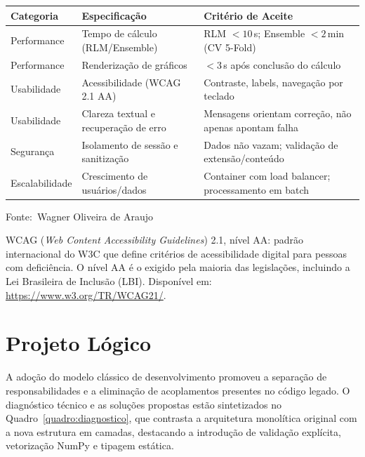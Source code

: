 \documentclass[12pt,a4paper]{article}
\newcommand{\oautor}{Wagner Oliveira de Araujo}
\begin{document}
\begin{quadro}[ht]
\centering
\small
\caption{Especificação de requisitos não funcionais}
\label{quadro:nao-funcionais}
\begin{threeparttable}
\begin{tabularx}{\textwidth}{|l|X|X|} \hline
\textbf{Categoria} & \textbf{Especificação} & \textbf{Critério de Aceite} \\ \hline
Performance & Tempo de cálculo (RLM/Ensemble) & RLM $< 10\,$s; Ensemble $< 2\,$min (CV 5-Fold) \\ \hline
Performance & Renderização de gráficos & $< 3\,$s após conclusão do cálculo \\ \hline
Usabilidade & Acessibilidade (WCAG 2.1 AA)\tnote{a} & Contraste, labels, navegação por teclado \\ \hline
Usabilidade & Clareza textual e recuperação de erro & Mensagens orientam correção, não apenas apontam falha \\ \hline
Segurança & Isolamento de sessão e sanitização & Dados não vazam; validação de extensão/conteúdo \\ \hline
Escalabilidade & Crescimento de usuários/dados & Container com load balancer; processamento em batch \\ \hline
\end{tabularx}
\begin{tablenotes}[flushleft]
\footnotesize
\item Fonte:~\oautor
\item[\textit{a}] WCAG (\textit{Web Content Accessibility Guidelines}) 2.1, nível AA: padrão internacional do W3C que define critérios de acessibilidade digital para pessoas com deficiência. O nível AA é o exigido pela maioria das legislações, incluindo a Lei Brasileira de Inclusão (LBI). Disponível em: \url{https://www.w3.org/TR/WCAG21/}.
\end{tablenotes}
\end{threeparttable}
\end{quadro}

\newpage
\section{Projeto Lógico}

A adoção do modelo clássico de desenvolvimento promoveu a separação de responsabilidades e a eliminação de acoplamentos presentes no código legado. O diagnóstico técnico e as soluções propostas estão sintetizados no Quadro~\ref{quadro:diagnostico}, que contrasta a arquitetura monolítica original com a nova estrutura em camadas, destacando a introdução de validação explícita, vetorização NumPy e tipagem estática.
\end{document}
